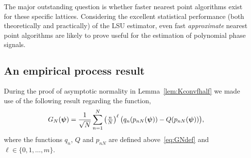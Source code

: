 \documentclass[journal]{IEEEtran}
\begin{document}
The major outstanding question is whether faster nearest point algorithms exist for these specific lattices.  Considering the excellent statistical performance (both theoretically and practically) of the LSU estimator, even fast \emph{approximate} nearest point algorithms are likely to prove useful for the estimation of polynomial phase signals. 
  


 
 
 
% 
 
 
% 
\small 
 


\normalsize
\appendix


\subsection{An empirical process result}

During the proof of asymptotic normality in Lemma~\ref{lem:Kconvfhalf} we made use of the following result regarding the function,
\[
G_N(\boldsymbol{\psi}) = \frac{1}{\sqrt{N}} \sum_{n=1}^{N}\left( \tfrac{n}{N}\right)^\ell  \big(q_n(p_{nN}(\boldsymbol{\psi})) - Q(p_{nN}(\boldsymbol{\psi})) \big),
\]
where the functions $q_n$, $Q$ and $p_{nN}$ are defined above~\eqref{eq:GNdef} and $\ell \in \{0, 1, \dots, m\}$.
\end{document}
